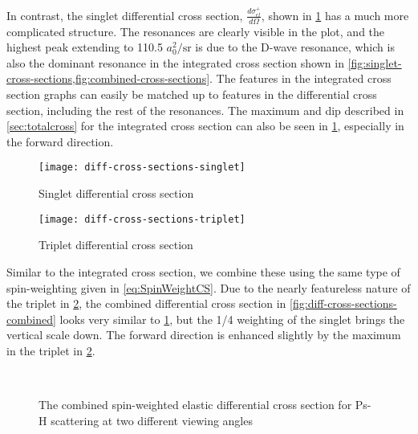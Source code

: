 \documentclass[Dissertation.tex]{subfiles}
\begin{document}
In contrast, the singlet differential cross section, $\frac{d\sigma_{el}^+}{d\Omega}$,
shown in \cref{fig:diff-cross-sections-singlet} has a much more complicated
structure. The resonances are clearly visible in the plot, and the highest peak
extending to 110.5 $a_0^2/\textrm{sr}$ is due to the D-wave resonance, which is
also the dominant resonance in the integrated cross section shown in
\cref{fig:singlet-cross-sections,fig:combined-cross-sections}. The features in
the integrated cross section graphs can easily be matched up to features in the
differential cross section, including the rest of the resonances. The maximum
and dip described in \cref{sec:totalcross} for the integrated cross section can
also be seen in \cref{fig:diff-cross-sections-singlet}, especially in the
forward direction.

\begin{figure}[H]
	\centering
	\texttt{[image: diff-cross-sections-singlet]}
	\caption{Singlet differential cross section}
	\label{fig:diff-cross-sections-singlet}
\end{figure}

\begin{figure}[H]
	\centering
	\texttt{[image: diff-cross-sections-triplet]}
	\caption{Triplet differential cross section}
	\label{fig:diff-cross-sections-triplet}
\end{figure}

Similar to the integrated cross section, we combine these using the same type
of spin-weighting given in \cref{eq:SpinWeightCS}. Due to the nearly featureless
nature of the triplet in \cref{fig:diff-cross-sections-triplet},
the combined differential cross section in 
\cref{fig:diff-cross-sections-combined} looks very similar to 
\cref{fig:diff-cross-sections-singlet}, but the 1/4 weighting of the singlet
brings the vertical scale down. The forward direction is enhanced slightly by
the maximum in the triplet in \cref{fig:diff-cross-sections-triplet}.

\begin{figure}[H]%
    \centering
     \\%
    \caption[The combined spin-weighted elastic differential cross section]{The combined spin-weighted elastic differential cross section for Ps-H scattering at two different viewing angles}%
    \label{fig:combined-diff-cross-sections}%
\end{figure}
\end{document}
